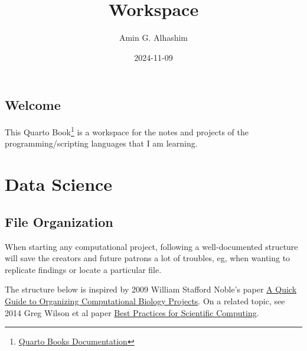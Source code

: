 \documentclass[
  letterpaper,
  DIV=11,
  numbers=noendperiod]{scrreprt}
\title{Workspace}
\author{Amin G. Alhashim}
\date{2024-11-09}
\renewcommand*\contentsname{Table of contents}
\newcommand\contentsname{Table of contents}
\begin{document}
\maketitle

\renewcommand*\contentsname{Table of contents}
{
\hypersetup{linkcolor=}
\setcounter{tocdepth}{2}
\tableofcontents
}


\chapter*{Welcome}\label{welcome}


This Quarto Book\footnote{\href{https://quarto.org/docs/books/}{Quarto
  Books Documentation}} is a workspace for the notes and projects of the
programming/scripting languages that I am learning.

\part{Data Science}

\chapter{File Organization}\label{file-organization}

When starting any computational project, following a well-documented
structure will save the creators and future patrons a lot of troubles,
eg, when wanting to replicate findings or locate a particular file.

The structure below is inspired by 2009 William Stafford Noble's paper
\href{https://journals.plos.org/ploscompbiol/article?id=10.1371/journal.pcbi.1000424}{A
Quick Guide to Organizing Computational Biology Projects}. On a related
topic, see 2014 Greg Wilson et al paper
\href{https://journals.plos.org/plosbiology/article?id=10.1371/journal.pbio.1001745}{Best
Practices for Scientific Computing}.
\end{document}
